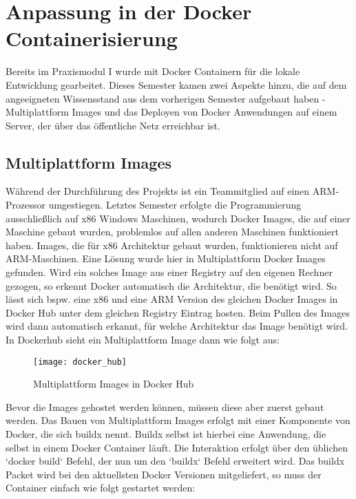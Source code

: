 \section{Anpassung in der Docker Containerisierung}\label{subsec:docker-containerisierung}

Bereits im Praxismodul I wurde mit Docker Containern für die lokale Entwicklung gearbeitet.
Dieses Semester kamen zwei Aspekte hinzu, die auf dem angeeigneten Wissensstand aus dem vorherigen Semester aufgebaut haben - Multiplattform Images und das Deployen von Docker Anwendungen auf einem Server, der über das öffentliche Netz erreichbar ist.

\subsection{Multiplattform Images}\label{subsubsec:multiplattform-images}
Während der Durchführung des Projekts ist ein Teammitglied auf einen ARM-Prozessor umgestiegen.
Letztes Semester erfolgte die Programmierung ausschließlich auf x86 Windows Maschinen, wodurch Docker Images, die auf einer Maschine gebaut wurden, problemlos auf allen anderen Maschinen funktioniert haben.
Images, die für x86 Architektur gebaut wurden, funktionieren nicht auf ARM-Maschinen.
Eine Lösung wurde hier in Multiplattform Docker Images gefunden.
Wird ein solches Image aus einer Registry auf den eigenen Rechner gezogen, so erkennt Docker automatisch die Architektur, die benötigt wird.
So lässt sich bspw. eine x86 und eine ARM Version des gleichen Docker Images in Docker Hub unter dem gleichen Registry Eintrag hosten.
Beim Pullen des Images wird dann automatisch erkannt, für welche Architektur das Image benötigt wird.
In Dockerhub sieht ein Multiplattform Image dann wie folgt aus:

\begin{figure}[h]
  \centering
  \texttt{[image: docker\_hub]}
  \caption{Multiplattform Images in Docker Hub}
  \label{fig:docker_hub}
\end{figure}

Bevor die Images gehostet werden können, müssen diese aber zuerst gebaut werden.
Das Bauen von Multiplattform Images erfolgt mit einer Komponente von Docker, die sich buildx nennt.
Buildx selbst ist hierbei eine Anwendung, die selbst in einem Docker Container läuft.
Die Interaktion erfolgt über den üblichen `docker build` Befehl, der nun um den `buildx` Befehl erweitert wird.
Das buildx Packet wird bei den aktuellsten Docker Versionen mitgeliefert, so muss der Container einfach wie folgt gestartet werden:

